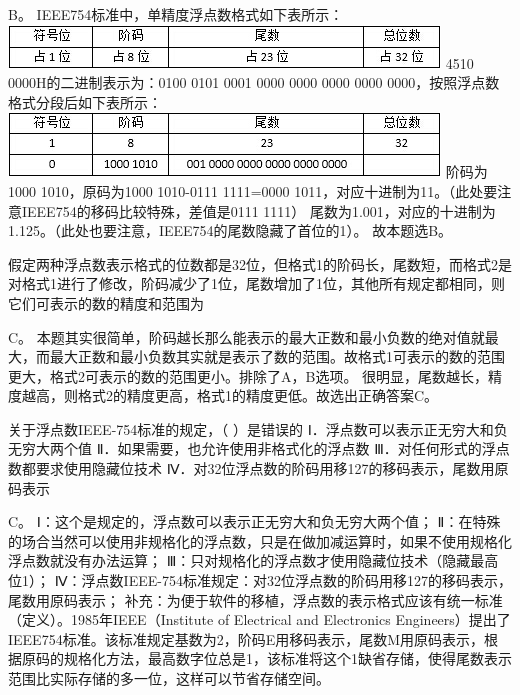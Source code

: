 \par\fourch{}{\textcolor{red}{}}{}{}
\begin{solution}B。 IEEE754标准中，单精度浮点数格式如下表所示：
\includegraphics[width=4.51042in,height=0.45833in]{computerassets/aa2982267974c6fb0d16d1ef6ea7562a.jpeg}
4510 0000H的二进制表示为：0100 0101 0001 0000 0000 0000 0000
0000，按照浮点数格式分段后如下表所示：
\includegraphics[width=4.51042in,height=0.67708in]{computerassets/42d8d4afe3909b90ccc7f0d4d3b29578.jpeg}
阶码为1000 1010，原码为1000 1010-0111 1111=0000
1011，对应十进制为11。（此处要注意IEEE754的移码比较特殊，差值是0111
1111）
尾数为1.001，对应的十进制为1.125。（此处也要注意，IEEE754的尾数隐藏了首位的1）。
故本题选B。
\end{solution}
\question 假定两种浮点数表示格式的位数都是32位，但格式1的阶码长，尾数短，而格式2是对格式1进行了修改，阶码减少了1位，尾数增加了1位，其他所有规定都相同，则它们可表示的数的精度和范围为
\par{}
\begin{solution}C。
本题其实很简单，阶码越长那么能表示的最大正数和最小负数的绝对值就最大，而最大正数和最小负数其实就是表示了数的范围。故格式1可表示的数的范围更大，格式2可表示的数的范围更小。排除了A，B选项。
很明显，尾数越长，精度越高，则格式2的精度更高，格式1的精度更低。故选出正确答案C。
\end{solution}
\question 关于浮点数IEEE-754标准的规定，（ ）是错误的
Ⅰ．浮点数可以表示正无穷大和负无穷大两个值
Ⅱ．如果需要，也允许使用非格式化的浮点数
Ⅲ．对任何形式的浮点数都要求使用隐藏位技术
Ⅳ．对32位浮点数的阶码用移127的移码表示，尾数用原码表示
\par{}
\begin{solution}C。 Ⅰ：这个是规定的，浮点数可以表示正无穷大和负无穷大两个值；
Ⅱ：在特殊的场合当然可以使用非规格化的浮点数，只是在做加减运算时，如果不使用规格化浮点数就没有办法运算；
Ⅲ：只对规格化的浮点数才使用隐藏位技术（隐藏最高位1）；
Ⅳ：浮点数IEEE-754标准规定：对32位浮点数的阶码用移127的移码表示，尾数用原码表示；
补充：为便于软件的移植，浮点数的表示格式应该有统一标准（定义）。1985年IEEE（Institute
of Electrical and Electronics
Engineers）提出了IEEE754标准。该标准规定基数为2，阶码E用移码表示，尾数M用原码表示，根据原码的规格化方法，最高数字位总是1，该标准将这个1缺省存储，使得尾数表示范围比实际存储的多一位，这样可以节省存储空间。
\end{solution}
